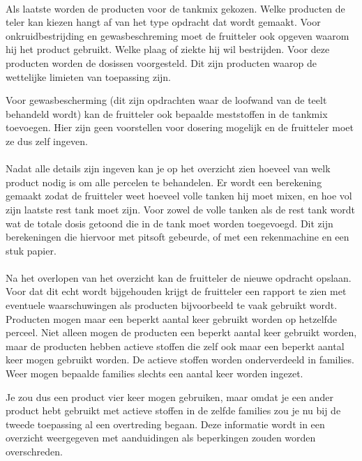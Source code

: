 \paragraph {} Als laatste worden de producten voor de tankmix gekozen. Welke producten de
teler kan kiezen hangt af van het type opdracht dat wordt gemaakt. Voor onkruidbestrijding
en gewasbeschreming moet de fruitteler ook opgeven waarom hij het product gebruikt. Welke plaag
of ziekte hij wil bestrijden. Voor deze producten worden de dosissen voorgesteld. Dit zijn
producten waarop de wettelijke limieten van toepassing zijn.

Voor gewasbescherming (dit zijn opdrachten waar de loofwand van de teelt behandeld wordt)
kan de fruitteler ook bepaalde meststoffen in de tankmix toevoegen. Hier zijn geen
voorstellen voor dosering mogelijk en de fruitteler moet ze dus zelf ingeven.

\paragraph {} Nadat alle details zijn ingeven kan je op het overzicht zien hoeveel van welk
product nodig is om alle percelen te behandelen. Er wordt een berekening gemaakt zodat de
fruitteler weet hoeveel volle tanken hij moet mixen, en hoe vol zijn laatste rest tank
moet zijn. Voor zowel de volle tanken als de rest tank wordt wat de totale dosis getoond
die in de tank moet worden toegevoegd. Dit zijn berekeningen die hiervoor met pitsoft
gebeurde, of met een rekenmachine en een stuk papier.

\paragraph {} Na het overlopen van het overzicht kan de fruitteler de nieuwe opdracht
opslaan. Voor dat dit echt wordt bijgehouden krijgt de fruitteler een rapport te zien met
eventuele waarschuwingen als producten bijvoorbeeld te vaak gebruikt wordt. Producten
mogen maar een beperkt aantal keer gebruikt worden op hetzelfde perceel. Niet alleen mogen
de producten een beperkt aantal keer gebruikt worden, maar de producten hebben actieve
stoffen die zelf ook maar een beperkt aantal keer mogen gebruikt worden. De actieve
stoffen worden onderverdeeld in families. Weer mogen bepaalde families slechts een aantal
keer worden ingezet.

Je zou dus een product vier keer mogen gebruiken, maar omdat je een ander product hebt
gebruikt met actieve stoffen in de zelfde families zou je nu bij de tweede toepassing al
een overtreding begaan. Deze informatie wordt in een overzicht weergegeven met
aanduidingen als beperkingen zouden worden overschreden.

